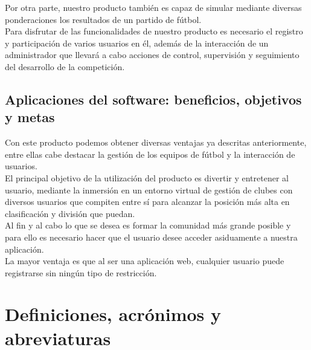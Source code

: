 Por otra parte, nuestro producto también es capaz de simular mediante
diversas ponderaciones los resultados de un partido de fútbol.\\

Para disfrutar de las funcionalidades de nuestro producto es necesario
el registro y participación de varios usuarios en él, además de la
interacción de un administrador que llevará a cabo acciones de
control, supervisión y seguimiento del desarrollo de la competición.

\subsection{Aplicaciones del software: beneficios, objetivos y metas}

Con este producto podemos obtener diversas ventajas ya descritas
anteriormente, entre ellas cabe destacar la gestión de los equipos de
fútbol y la interacción de usuarios.\\

El principal objetivo de la utilización del producto es divertir y
entretener al usuario, mediante la inmersión en un entorno virtual de
gestión de clubes con diversos usuarios que compiten entre sí para
alcanzar la posición más alta en clasificación y división que puedan.\\

Al fin y al cabo lo que se desea es formar la comunidad más grande
posible y para ello es necesario hacer que el usuario desee acceder
asiduamente a nuestra aplicación.\\

La mayor ventaja es que al ser una aplicación web, cualquier usuario
puede registrarse sin ningún tipo de restricción.

\section{Definiciones, acrónimos y abreviaturas}

